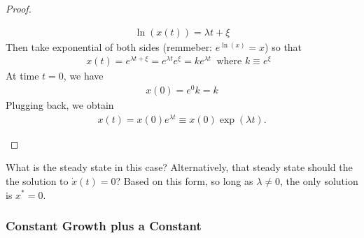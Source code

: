 \documentclass[11pt,a4paper]{book}
\theoremstyle{definition}\newtheorem{definition}{Definition}
\theoremstyle{definition}\newtheorem{fact}{Fact}
\theoremstyle{definition}\newtheorem{remark}{Remark}
\theoremstyle{definition}\newtheorem{ex}{Ex.}
\theoremstyle{definition}\newtheorem{project}{Project}
\theoremstyle{definition}\newtheorem{problem}{Problem}
\theoremstyle{definition}\newtheorem{example}{Example}
\numberwithin{theorem}{section}
\numberwithin{corollary}{chapter}
\numberwithin{assumption}{chapter}
\numberwithin{definition}{chapter}
\numberwithin{prop}{chapter}
\numberwithin{notation}{chapter}
\numberwithin{problem}{chapter}
\numberwithin{example}{chapter}
\numberwithin{fact}{chapter}
\numberwithin{ex}{chapter}
\begin{document}
\begin{proof}
\begin{enumerate}
			\begin{align*}
				\ln(x(t)) = \lambda t + \xi 
			\end{align*}
			Then take exponential of both sides (remmeber: $e^{\ln(x)} = x$) so that
			\begin{align*}
				x(t) = e^{\lambda t + \xi} = e^{\lambda t} e^{\xi} = k e^{\lambda t} \ \text{ where $k \equiv e^\xi$ }
			\end{align*}
			At time $t=0$, we have
			\begin{align*}
				x(0) = e^{0} k = k
			\end{align*}
			Plugging back, we obtain
			\begin{align*}
				x(t) = x(0) e^{\lambda t} \equiv x(0) \exp(\lambda t).
			\end{align*}
		\end{enumerate}
	\end{proof}
	What is the steady state in this case? Alternatively, that steady state should the the solution to $\dot{x}(t) = 0$? Based on this form, so long as $\lambda \neq 0$, the only solution is $x^* = 0$. 
	
	\subsubsection{Constant Growth plus a Constant}
	
\end{document}
